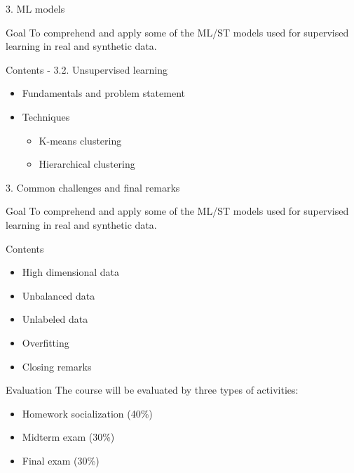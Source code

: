 \documentclass[
  ignorenonframetext,
]{beamer}
\providecommand{\tightlist}{%
  \setlength{\itemsep}{0pt}\setlength{\parskip}{0pt}}\usepackage{longtable,booktabs,array}
\begin{document}
\begin{frame}{3. ML models}
\protect\hypertarget{ml-models-3}{}
\begin{alertblock}{Goal}
\protect\hypertarget{goal-10}{}
To comprehend and apply some of the ML/ST models used for supervised
learning in real and synthetic data.
\end{alertblock}

\begin{exampleblock}{Contents - 3.2. Unsupervised learning}
\protect\hypertarget{contents---3.2.-unsupervised-learning}{}
\begin{itemize}
\tightlist
\item
  Fundamentals and problem statement
\item
  Techniques

  \begin{itemize}
  \tightlist
  \item
    K-means clustering
  \item
    Hierarchical clustering
  \end{itemize}
\end{itemize}
\end{exampleblock}
\end{frame}

\begin{frame}{3. Common challenges and final remarks}
\protect\hypertarget{common-challenges-and-final-remarks}{}
\begin{alertblock}{Goal}
\protect\hypertarget{goal-11}{}
To comprehend and apply some of the ML/ST models used for supervised
learning in real and synthetic data.
\end{alertblock}

\begin{exampleblock}{Contents}
\protect\hypertarget{contents}{}
\begin{itemize}
\tightlist
\item
  High dimensional data
\item
  Unbalanced data
\item
  Unlabeled data
\item
  Overfitting
\item
  Closing remarks
\end{itemize}
\end{exampleblock}
\end{frame}

\begin{frame}{Evaluation}
\protect\hypertarget{evaluation}{}
The course will be evaluated by three types of activities:

\begin{itemize}
\tightlist
\item
  Homework socialization (40\%)
\item
  Midterm exam (30\%)
\item
  Final exam (30\%)
\end{itemize}
\end{frame}
\end{document}

